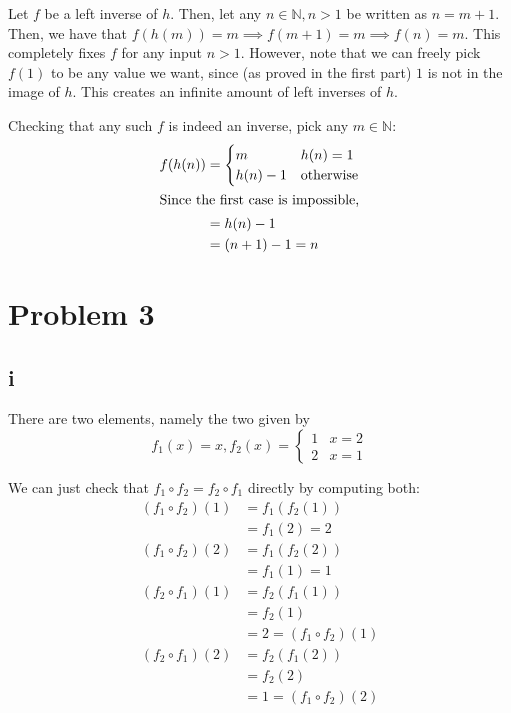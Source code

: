 \documentclass[12pt,letterpaper]{article}
\theoremstyle{definition}
\newcommand{\N}{\mathbb{N}}
\begin{document}
Let $f$ be a left inverse of $h$. Then, let any $n \in \N, n > 1$ be written as
$n = m + 1$. Then, we have that $f(h(m)) = m \implies f(m + 1) = m \implies
f(n) = m$. This completely fixes $f$ for any input $n > 1$. However, note that
we can freely pick $f(1)$ to be any value we want, since (as proved in the first
part) $1$ is not in the image of $h$. This creates an infinite amount of left
inverses of $h$.

Checking that any such $f$ is indeed an inverse, pick any $m \in \N$:
\begin{align*}
  f(h(n)) &=
  \begin{cases}
    m & h(n) = 1 \\
    h(n) - 1 & \text{otherwise}
  \end{cases} \\
  \intertext{Since the first case is impossible,}
          &= h(n) - 1 \\
          &= (n + 1) - 1 = n
\end{align*}

\section*{Problem 3}

\subsection*{i}

There are two elements, namely the two given by
\[
  f_1(x) = x, f_2(x) = 
  \begin{cases}
    1 & x = 2 \\
    2 & x = 1
  \end{cases}
\]

We can just check that $f_1 \circ f_2 = f_2 \circ f_1$ directly by computing
both:
\begin{align*}
  (f_1 \circ f_2)(1) &= f_1(f_2(1)) \\
                     &= f_1(2) = 2 \\
  (f_1 \circ f_2)(2) &= f_1(f_2(2)) \\
                     &= f_1(1) = 1 \\
  (f_2 \circ f_1)(1) &= f_2(f_1(1)) \\
                     &= f_2(1) \\
                     &= 2 = (f_1 \circ f_2)(1) \\
  (f_2 \circ f_1)(2) &= f_2(f_1(2)) \\
                     &= f_2(2) \\
                     &= 1 = (f_1 \circ f_2)(2)
\end{align*}
\end{document}
